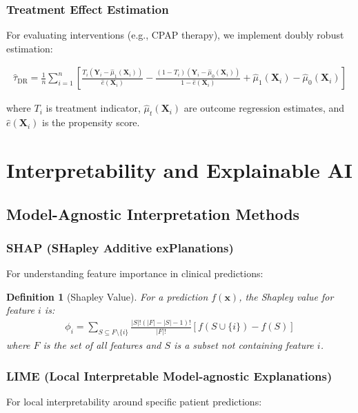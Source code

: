 \documentclass[11pt]{article}
\newtheorem{definition}{Definition}
\begin{document}
\subsubsection{Treatment Effect Estimation}
For evaluating interventions (e.g., CPAP therapy), we implement doubly robust estimation:

\begin{align}
\hat{\tau}_{\text{DR}} = \frac{1}{n} \sum_{i=1}^n \left[ \frac{T_i (\mathbf{Y}_i - \hat{\mu}_1(\mathbf{X}_i))}{\hat{e}(\mathbf{X}_i)} - \frac{(1-T_i)(\mathbf{Y}_i - \hat{\mu}_0(\mathbf{X}_i))}{1-\hat{e}(\mathbf{X}_i)} + \hat{\mu}_1(\mathbf{X}_i) - \hat{\mu}_0(\mathbf{X}_i) \right]
\end{align}

where $T_i$ is treatment indicator, $\hat{\mu}_t(\mathbf{X}_i)$ are outcome regression estimates, and $\hat{e}(\mathbf{X}_i)$ is the propensity score.

\section{Interpretability and Explainable AI}
\label{sec:interpretability}

\subsection{Model-Agnostic Interpretation Methods}

\subsubsection{SHAP (SHapley Additive exPlanations)}
For understanding feature importance in clinical predictions:

\begin{definition}[Shapley Value]
For a prediction $f(\mathbf{x})$, the Shapley value for feature $i$ is:
\begin{align}
\phi_i = \sum_{S \subseteq F \setminus \{i\}} \frac{|S|!(|F| - |S| - 1)!}{|F|!} [f(S \cup \{i\}) - f(S)]
\end{align}
where $F$ is the set of all features and $S$ is a subset not containing feature $i$.
\end{definition}

\subsubsection{LIME (Local Interpretable Model-agnostic Explanations)}
For local interpretability around specific patient predictions:
\end{document}
